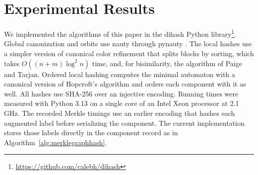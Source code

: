 \documentclass[twoside,leqno]{article}
\begin{document}
\section{Experimental Results}
\label{sec:experiments}

We implemented the algorithms of this paper in the dihash Python library\footnote{\url{https://github.com/calebh/dihash}}. Global canonization and orbits use nauty through pynauty \cite{nauty}. The local hashes use a simpler version of canonical color refinement that splits blocks by sorting, which takes $O((n+m)\log^2 n)$ time, and, for bisimilarity, the algorithm of Paige and Tarjan. Ordered local hashing computes the minimal automaton with a canonical version of Hopcroft's algorithm and orders each component with it as well. All hashes use SHA-256 over an injective encoding. Running times were measured with Python 3.13 on a single core of an Intel Xeon processor at 2.1\,GHz. The recorded Merkle timings use an earlier encoding that hashes each augmented label before serializing the component. The current implementation stores those labels directly in the component record as in Algorithm~\ref{alg:merklegraphhash}.
\end{document}
